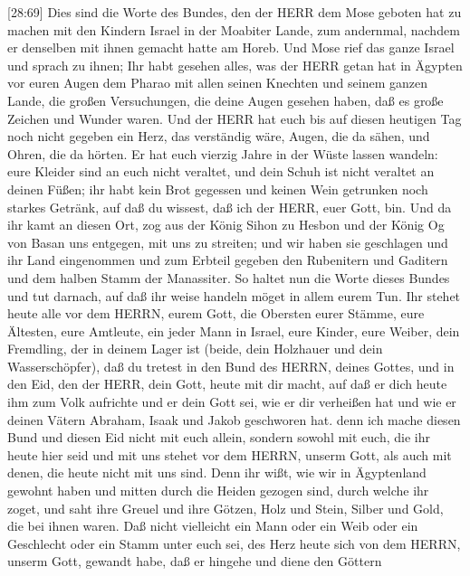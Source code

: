  {[}28:69{]} Dies sind die Worte des Bundes, den der HERR
dem Mose geboten hat zu machen mit den Kindern Israel in der Moabiter
Lande, zum andernmal, nachdem er denselben mit ihnen gemacht hatte am
Horeb.  Und Mose rief das ganze Israel und sprach zu ihnen;
Ihr habt gesehen alles, was der HERR getan hat in Ägypten vor euren
Augen dem Pharao mit allen seinen Knechten und seinem ganzen Lande,
 die großen Versuchungen, die deine Augen gesehen haben, daß
es große Zeichen und Wunder waren.  Und der HERR hat euch
bis auf diesen heutigen Tag noch nicht gegeben ein Herz, das verständig
wäre, Augen, die da sähen, und Ohren, die da hörten.  Er hat
euch vierzig Jahre in der Wüste lassen wandeln: eure Kleider sind an
euch nicht veraltet, und dein Schuh ist nicht veraltet an deinen Füßen;
 ihr habt kein Brot gegessen und keinen Wein getrunken noch
starkes Getränk, auf daß du wissest, daß ich der HERR, euer Gott, bin.
 Und da ihr kamt an diesen Ort, zog aus der König Sihon zu
Hesbon und der König Og von Basan uns entgegen, mit uns zu streiten; und
wir haben sie geschlagen  und ihr Land eingenommen und zum
Erbteil gegeben den Rubenitern und Gaditern und dem halben Stamm der
Manassiter.  So haltet nun die Worte dieses Bundes und tut
darnach, auf daß ihr weise handeln möget in allem eurem Tun.
 Ihr stehet heute alle vor dem HERRN, eurem Gott, die
Obersten eurer Stämme, eure Ältesten, eure Amtleute, ein jeder Mann in
Israel,  eure Kinder, eure Weiber, dein Fremdling, der in
deinem Lager ist (beide, dein Holzhauer und dein Wasserschöpfer),
 daß du tretest in den Bund des HERRN, deines Gottes, und
in den Eid, den der HERR, dein Gott, heute mit dir macht, 
auf daß er dich heute ihm zum Volk aufrichte und er dein Gott sei, wie
er dir verheißen hat und wie er deinen Vätern Abraham, Isaak und Jakob
geschworen hat.  denn ich mache diesen Bund und diesen Eid
nicht mit euch allein,  sondern sowohl mit euch, die ihr
heute hier seid und mit uns stehet vor dem HERRN, unserm Gott, als auch
mit denen, die heute nicht mit uns sind.  Denn ihr wißt,
wie wir in Ägyptenland gewohnt haben und mitten durch die Heiden gezogen
sind, durch welche ihr zoget,  und saht ihre Greuel und
ihre Götzen, Holz und Stein, Silber und Gold, die bei ihnen waren.
 Daß nicht vielleicht ein Mann oder ein Weib oder ein
Geschlecht oder ein Stamm unter euch sei, des Herz heute sich von dem
HERRN, unserm Gott, gewandt habe, daß er hingehe und diene den Göttern
